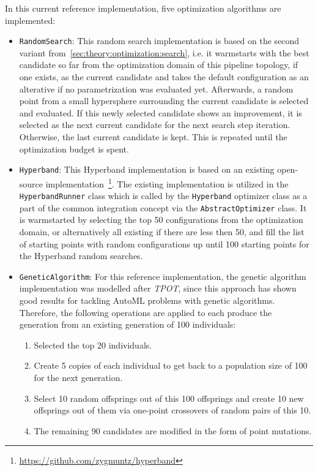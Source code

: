 In this current reference implementation, five optimization algorithms are implemented:
\begin{itemize}
    \item \texttt{RandomSearch}: This random search implementation is based on the second variant from~\ref{sec:theory:optimization:search}, i.e. it warmstarts with the best candidate so far from the optimization domain of this pipeline topology, if one exists, as the current candidate and takes the default configuration as an alterative if no parametrization was evaluated yet.
    Afterwards, a random point from a small hypersphere surrounding the current candidate is selected and evaluated.
    If this newly selected candidate shows an improvement, it is selected as the next current candidate for the next search step iteration.
    Otherwise, the last current candidate is kept.
    This is repeated until the optimization budget is spent.
    \item \texttt{Hyperband}: This Hyperband implementation is based on an existing open-source implementation~\footnote{\url{https://github.com/zygmuntz/hyperband}}.
    The existing implementation is utilized in the \texttt{HyperbandRunner} class which is called by the \texttt{Hyperband} optimizer class as a part of the common integration concept via the \texttt{AbstractOptimizer} class.
    It is warmstarted by selecting the top 50 configurations from the optimization domain, or alternatively all existing if there are less then 50, and fill the list of starting points with random configurations up until 100 starting points for the Hyperband random searches.
    \item \texttt{GeneticAlgorithm}: For this reference implementation, the genetic algorithm implementation was modelled after \textit{TPOT}, since this approach has shown good results for tackling AutoML problems with genetic algorithms.
    Therefore, the following operations are applied to each produce the generation from an existing generation of 100 individuals:
        \begin{enumerate}
            \item Selected the top 20 individuals.
            \item Create 5 copies of each individual to get back to a population size of 100 for the next generation.
            \item Select 10 random offsprings out of this 100 offsprings and create 10 new offsprings out of them via one-point crossovers of random pairs of this 10.
            \item The remaining 90 candidates are modified in the form of point mutations.

\end{enumerate}
\end{itemize}
